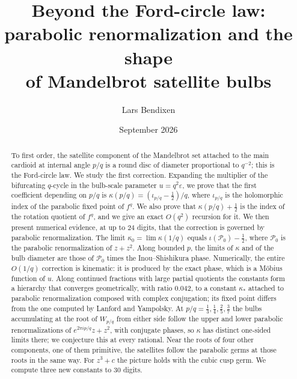 \documentclass[11pt]{amsart}
\theoremstyle{definition}
\theoremstyle{remark}
\newcommand{\PP}{\mathcal{P}_0}
\begin{document}
\title[Beyond the Ford-circle law]{Beyond the Ford-circle law:\\ parabolic renormalization and the shape\\ of Mandelbrot satellite bulbs}
\author{Lars Bendixen}
\date{September 2026}

\begin{abstract}
To first order, the satellite component of the Mandelbrot set attached to the main cardioid at internal angle $p/q$ is a round disc of diameter proportional to $q^{-2}$; this is the Ford-circle law. We study the first correction. Expanding the multiplier of the bifurcating $q$-cycle in the bulb-scale parameter $u=q^2\varepsilon$, we prove that the first coefficient depending on $p/q$ is $\kappa(p/q)=(\iota_{p/q}-\frac12)/q$, where $\iota_{p/q}$ is the holomorphic index of the parabolic fixed point of $f^q$. We also prove that $\kappa(p/q)+\frac12$ is the index of the rotation quotient of $f^q$, and we give an exact $O(q^2)$ recursion for it. We then present numerical evidence, at up to $24$ digits, that the correction is governed by parabolic renormalization. The limit $\kappa_0=\lim\kappa(1/q)$ equals $\iota(\PP)-\frac12$, where $\PP$ is the parabolic renormalization of $z+z^2$. Along bounded $p$, the limits of $\kappa$ and of the bulb diameter are those of $\PP$ times the Inou--Shishikura phase. Numerically, the entire $O(1/q)$ correction is kinematic: it is produced by the exact phase, which is a M\"obius function of $u$. Along continued fractions with large partial quotients the constants form a hierarchy that converges geometrically, with ratio $0.042$, to a constant $\kappa_*$ attached to parabolic renormalization composed with complex conjugation; its fixed point differs from the one computed by Lanford and Yampolsky. At $p/q=\frac13,\frac14,\frac25,\frac37$ the bulbs accumulating at the root of $W_{p/q}$ from either side follow the upper and lower parabolic renormalizations of $e^{2\pi ip/q}z+z^2$, with conjugate phases, so $\kappa$ has distinct one-sided limits there; we conjecture this at every rational. Near the roots of four other components, one of them primitive, the satellites follow the parabolic germs at those roots in the same way. For $z^3+c$ the picture holds with the cubic cusp germ. We compute three new constants to 30 digits.
\end{abstract}
\end{document}
